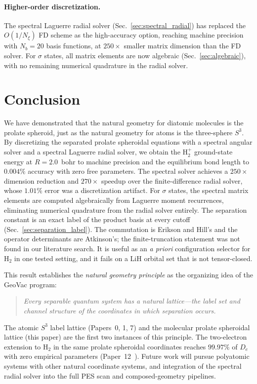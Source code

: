 \documentclass[aps,pra,twocolumn,superscriptaddress,longbibliography]{revtex4-2}
\begin{document}
\paragraph{Higher-order discretization.}
The spectral Laguerre radial solver (Sec.~\ref{sec:spectral_radial})
has replaced the $O(1/N_\xi)$ FD scheme as the high-accuracy option,
reaching machine precision with $N_b = 20$ basis
functions, at $250\times$ smaller matrix dimension than the FD solver.  For $\sigma$ states, all matrix elements
are now algebraic (Sec.~\ref{sec:algebraic}), with no remaining
numerical quadrature in the radial solver.


\section{Conclusion}
\label{sec:conclusion}

We have demonstrated that the natural geometry for diatomic molecules
is the prolate spheroid, just as the natural geometry for atoms is
the three-sphere $S^3$.  By discretizing the separated prolate
spheroidal equations with a spectral angular solver and a spectral
Laguerre radial solver, we obtain the H$_2^+$ ground-state
energy at $R = 2.0$~bohr to machine precision and the equilibrium bond
length to $0.004\%$ accuracy with zero free parameters.  The spectral solver
achieves a $250\times$ dimension reduction and $270\times$ speedup
over the finite-difference radial solver, whose $1.01\%$ error was
a discretization artifact.  For $\sigma$ states, the spectral matrix
elements are computed algebraically from Laguerre moment recurrences,
eliminating numerical quadrature from the radial solver entirely.
The separation constant is an exact label of the product basis at
every cutoff (Sec.~\ref{sec:separation_label}). The commutation is
Erikson and Hill's and the operator determinants are Atkinson's; the
finite-truncation statement was not found in our literature search. It is useful as an \emph{a priori}
configuration selector for H$_2$ in one tested setting, and it fails on
a LiH orbital set that is not tensor-closed.

This result establishes the \emph{natural geometry principle} as
the organizing idea of the GeoVac program:
\begin{quote}
\emph{Every separable quantum system has a natural lattice---the
label set and channel structure of the coordinates in which separation
occurs.}
\end{quote}
The atomic $S^3$ label lattice (Papers~0, 1, 7) and the molecular prolate
spheroidal lattice (this paper) are the first two instances of this
principle.  The two-electron extension to H$_2$ in the same prolate
spheroidal coordinates reaches $99.97\%$ of $D_e$ with zero empirical
parameters (Paper~12~\cite{loutey_paper12}).  Future work will pursue polyatomic systems with other natural coordinate
systems, and integration of the spectral radial solver into the
full PES scan and composed-geometry pipelines.
\end{document}

